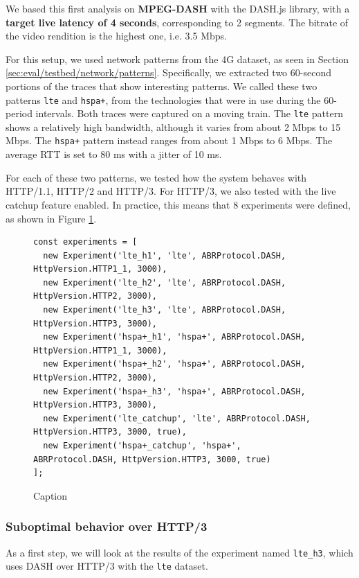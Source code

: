 We based this first analysis on \textbf{MPEG-DASH} with the DASH.js library, with a \textbf{target live latency of 4 seconds}, corresponding to 2 segments. The bitrate of the video rendition is the highest one, i.e. 3.5 Mbps.

For this setup, we used network patterns from the 4G dataset, as seen in Section \ref{sec:eval/testbed/network/patterns}. Specifically, we extracted two 60-second portions of the traces that show interesting patterns. We called these two patterns \texttt{lte} and \texttt{hspa+}, from the technologies that were in use during the 60-period intervals. Both traces were captured on a moving train. The \texttt{lte} pattern shows a relatively high bandwidth, although it varies from about 2 Mbps to 15 Mbps. The \texttt{hspa+} pattern instead ranges from about 1 Mbps to 6 Mbps. The average RTT is set to 80 ms with a jitter of 10 ms.

For each of these two patterns, we tested how the system behaves with HTTP/1.1, HTTP/2 and HTTP/3. For HTTP/3, we also tested with the live catchup feature enabled. In practice, this means that 8 experiments were defined, as shown in Figure \ref{fig:experiments1}.

\begin{figure}[h]
    \centering
    \begin{verbatim}
const experiments = [
  new Experiment('lte_h1', 'lte', ABRProtocol.DASH, HttpVersion.HTTP1_1, 3000),
  new Experiment('lte_h2', 'lte', ABRProtocol.DASH, HttpVersion.HTTP2, 3000),
  new Experiment('lte_h3', 'lte', ABRProtocol.DASH, HttpVersion.HTTP3, 3000),
  new Experiment('hspa+_h1', 'hspa+', ABRProtocol.DASH, HttpVersion.HTTP1_1, 3000),
  new Experiment('hspa+_h2', 'hspa+', ABRProtocol.DASH, HttpVersion.HTTP2, 3000),
  new Experiment('hspa+_h3', 'hspa+', ABRProtocol.DASH, HttpVersion.HTTP3, 3000),
  new Experiment('lte_catchup', 'lte', ABRProtocol.DASH, HttpVersion.HTTP3, 3000, true),
  new Experiment('hspa+_catchup', 'hspa+', ABRProtocol.DASH, HttpVersion.HTTP3, 3000, true)
];
    \end{verbatim}
    \caption{Caption}
    \label{fig:experiments1}
\end{figure}

\subsubsection{Suboptimal behavior over HTTP/3}
\label{sec:eval/non-abr/h3-behavior}

As a first step, we will look at the results of the experiment named \texttt{lte\_h3}, which uses DASH over HTTP/3 with the \texttt{lte} dataset.

